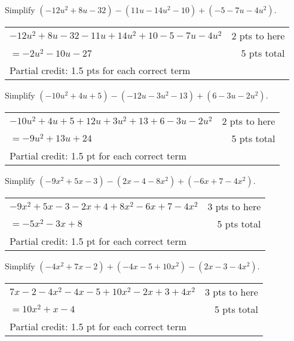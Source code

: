 {
	Simplify $(-12u^2+8u-32)-(11u-14u^2-10)+(-5-7u-4u^2)$.
}
{
	\begin{tabular}{l r}
	$-12u^2+8u-32-11u+14u^2+10 -5-7u-4u^2$  & 2 pts to here\\
	$=-2u^2-10u-27$ & 5 pts total\\
	Partial credit: 1.5 pts for each correct term
	\end{tabular}
}

{
	Simplify $(-10u^2+4u+5)-(-12u-3u^2-13)+(6-3u-2u^2)$.
}
{
	\begin{tabular}{l r}
	$-10u^2+4u+5+12u+3u^2+13+6-3u-2u^2$ & 2 pts to here\\
	$=-9u^2+13u+24$ &5 pts total\\
	Partial credit: 1.5 pt for each correct term
	\end{tabular}
}

{
	Simplify $(-9x^2+5x-3)-(2x-4-8x^2)+(-6x+7-4x^2)$.
}
{
	\begin{tabular}{l r}
	$-9x^2+5x-3-2x+4+8x^2-6x+7-4x^2$ & 3 pts to here\\
	$=-5x^2-3x+8$ & 5 pts total\\
	Partial credit: 1.5 pt for each correct term
	\end{tabular}
}

{
	Simplify $(-4x^2+7x-2)+(-4x-5+10x^2)-(2x-3-4x^2)$.
}
{
	\begin{tabular}{l r}
	$7x-2-4x^2-4x-5+10x^2-2x+3+4x^2$ & 3 pts to here\\
	$=10x^2+x-4$ & 5 pts total\\
	Partial credit: 1.5 pt for each correct term
	\end{tabular}
}
